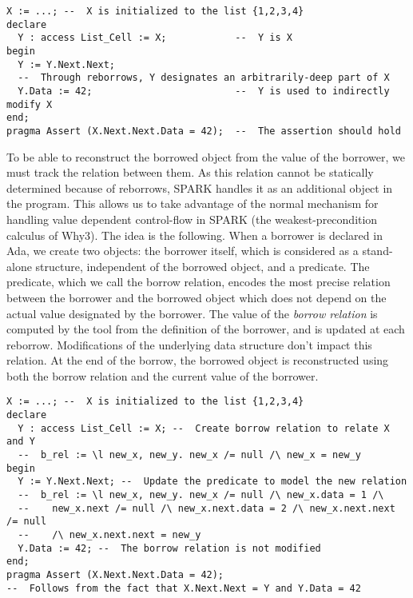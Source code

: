 \documentclass[runningheads]{llncs}
\begin{document}
\begin{lstlisting}
X := ...; --  X is initialized to the list {1,2,3,4}
declare
  Y : access List_Cell := X;            --  Y is X
begin
  Y := Y.Next.Next;
  --  Through reborrows, Y designates an arbitrarily-deep part of X
  Y.Data := 42;                         --  Y is used to indirectly modify X
end;
pragma Assert (X.Next.Next.Data = 42);  --  The assertion should hold
\end{lstlisting}
To be able to reconstruct the borrowed object from the value of the borrower, we must track the relation between them. As this relation cannot be statically determined because of reborrows, SPARK handles it as an additional object in the program. This allows us to take advantage of the normal mechanism for handling value dependent control-flow in SPARK (the weakest-precondition calculus of Why3).
The idea is the following. When a borrower is declared in Ada, we create two objects: the borrower itself, which is considered as a stand-alone structure, independent of the borrowed object, and a predicate. The predicate, which we call the borrow relation, encodes the most precise relation between the borrower and the borrowed object which does not depend on the actual value designated by the borrower. The value of the \emph{borrow relation} is computed by the tool from the definition of the borrower, and is updated at each reborrow. Modifications of the underlying data structure don't impact this relation. At the end of the borrow, the borrowed object is reconstructed using both the borrow relation and the current value of the borrower.
\begin{lstlisting}
X := ...; --  X is initialized to the list {1,2,3,4}
declare
  Y : access List_Cell := X; --  Create borrow relation to relate X and Y
  --  b_rel := \l new_x, new_y. new_x /= null /\ new_x = new_y
begin
  Y := Y.Next.Next; --  Update the predicate to model the new relation
  --  b_rel := \l new_x, new_y. new_x /= null /\ new_x.data = 1 /\
  --    new_x.next /= null /\ new_x.next.data = 2 /\ new_x.next.next /= null
  --    /\ new_x.next.next = new_y
  Y.Data := 42; --  The borrow relation is not modified
end;
pragma Assert (X.Next.Next.Data = 42);
--  Follows from the fact that X.Next.Next = Y and Y.Data = 42
\end{lstlisting}
\end{document}
